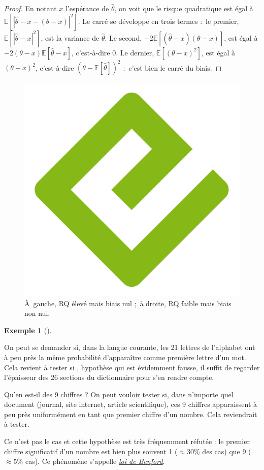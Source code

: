 \documentclass[
  10,
  letterpaper,
  DIV=11,
  numbers=noendperiod]{scrreport}
\theoremstyle{plain}
\theoremstyle{definition}
\theoremstyle{definition}
\newtheorem{example}{Exemple}[chapter]
\theoremstyle{remark}
\begin{document}
\begin{proof}
En notant \(x\) l'espérance de \(\hat{\theta}\), on voit que le risque
quadratique est égal à
\(\mathbb{E}[|\hat{\theta} - x - (\theta - x)|^2]\). Le carré se
développe en trois termes :~le premier,
\(\mathbb{E}[|\hat{\theta} - x|^2]\), est la variance de
\(\hat{\theta}\). Le second,
\(-2\mathbb{E}[(\hat{\theta} - x)(\theta - x)]\), est égal à
\(-2(\theta - x)\mathbb{E}[\hat{\theta} - x]\), c'est-à-dire 0. Le
dernier, \(\mathbb{E}[(\theta - x)^2]\), est égal à \((\theta - x)^2\),
c'est-à-dire \((\theta - \mathbb{E}[\hat{\theta}])^2\) :~c'est bien le
carré du biais.
\end{proof}

\begin{figure}[H]

{\centering \includegraphics[width=0.5\linewidth,height=\textheight,keepaspectratio]{images/cover.png}

}

\caption{À~gauche, RQ élevé mais biais nul ;~à droite, RQ faible mais
biais non nul.}

\end{figure}%

\begin{example}[]\protect\hypertarget{exm-testadeq}{}\label{exm-testadeq}

On peut se demander si, dans la langue courante, les 21 lettres de
l'alphabet ont à peu près la même probabilité d'apparaître comme
première lettre d'un mot. Cela revient à tester si , hypothèse qui est
évidemment fausse, il suffit de regarder l'épaisseur des 26 sections du
dictionnaire pour s'en rendre compte.

Qu'en est-il des 9 chiffres ? On peut vouloir tester si, dans n'importe
quel document (journal, site internet, article scientifique), ces 9
chiffres apparaissent à peu près uniformément en tant que premier
chiffre d'un nombre. Cela reviendrait à tester.

Ce n'est pas le cas et cette hypothèse est très fréquemment réfutée : le
premier chiffre significatif d'un nombre est bien plus souvent 1
(\(\approx 30\%\) des cas) que \(9\) (\(\approx 5\%\) cas). Ce phénomène
s'appelle \href{https://fr.wikipedia.org/wiki/Loi_de_Benford}{\emph{loi
de Benford}}.

\end{example}
\end{document}
